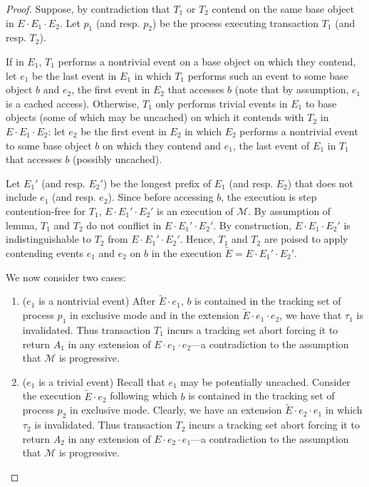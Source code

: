 \begin{proof}
%
Suppose, by contradiction that $T_1$ or $T_2$ 
contend on the same base object in $E\cdot E_1\cdot E_2$.
Let $p_1$ (and resp. $p_2$) be the process executing transaction $T_1$ (and resp. $T_2$).

If in $E_1$, $T_1$ performs a nontrivial event on a base object on which they contend, let $e_1$ be the last
event in $E_1$ in which $T_1$ performs such an event to some base object $b$ and $e_2$, the first event
in $E_2$ that accesses $b$ (note that by assumption, $e_1$ is a cached access).
Otherwise, $T_1$ only performs trivial events in $E_1$ to base objects (some of which may be uncached) on which it contends with $T_2$ in $E\cdot E_1\cdot E_2$:
let $e_2$ be the first event in $E_2$ in which $E_2$ performs a nontrivial event to some base object $b$
on which they contend and $e_1$, the last event of $E_1$ in $T_1$ that accesses $b$ (possibly uncached).

Let $E_1'$ (and resp. $E_2'$) be the longest prefix of $E_1$ (and resp. $E_2$) that does not include
$e_1$ (and resp. $e_2$).
Since before accessing $b$, the execution is step contention-free for $T_1$, $E \cdot
E_1'\cdot E_2'$ is an execution of $\mathcal{M}$.
By assumption of lemma, $T_1$ and $T_2$ do not conflict in $E \cdot E_1'\cdot E_2'$.
By construction, $E\cdot E_1 \cdot E_2'$ is indistinguishable to $T_2$ from $E\cdot E_1' \cdot E_2'$.
Hence, $T_1$ and $T_2$ are poised to apply contending events $e_1$ and $e_2$ on $b$ in the execution
$\tilde E=E\cdot E_1' \cdot E_2'$.

We now consider two cases:
\begin{enumerate}
\item 
($e_1$ is a nontrivial event)
After $\tilde E\cdot e_1$, $b$ is contained in the tracking set of process
$p_1$ in exclusive mode and in the extension $\tilde E\cdot e_1 \cdot e_2$, we have that
$\tau_1$ is invalidated. Thus transaction $T_1$ incurs a tracking set abort forcing
it to return $A_1$ in any extension of $E\cdot e_1\cdot e_2$---a contradiction
to the assumption that $\mathcal{M}$ is progressive.   
\item
($e_1$ is a trivial event)
Recall that $e_1$ may be potentially uncached.
Consider the execution $\tilde E\cdot e_2$ following which $b$ is contained in the tracking set of process
$p_2$ in exclusive mode. Clearly, we have an extension $\tilde E\cdot e_2 \cdot e_1$ in which
$\tau_2$ is invalidated. Thus transaction $T_2$ incurs a tracking set abort forcing
it to return $A_2$ in any extension of $E\cdot e_2\cdot e_1$---a contradiction
to the assumption that $\mathcal{M}$ is progressive.   
\end{enumerate}
\end{proof}
